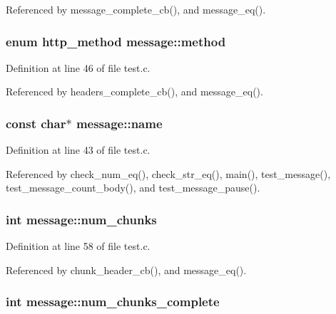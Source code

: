 Referenced by message\+\_\+complete\+\_\+cb(), and message\+\_\+eq().

\subsubsection[{method}]{\setlength{\rightskip}{0pt plus 5cm}enum {\bf http\+\_\+method} message\+::method}\label{structmessage_a9707fdb13e3f05606b4fad35b404c5e8}


Definition at line 46 of file test.\+c.



Referenced by headers\+\_\+complete\+\_\+cb(), and message\+\_\+eq().

\subsubsection[{name}]{\setlength{\rightskip}{0pt plus 5cm}const char$\ast$ message\+::name}\label{structmessage_a46a17bdb897a45bb7311769fd35821fb}


Definition at line 43 of file test.\+c.



Referenced by check\+\_\+num\+\_\+eq(), check\+\_\+str\+\_\+eq(), main(), test\+\_\+message(), test\+\_\+message\+\_\+count\+\_\+body(), and test\+\_\+message\+\_\+pause().

\subsubsection[{num\+\_\+chunks}]{\setlength{\rightskip}{0pt plus 5cm}int message\+::num\+\_\+chunks}\label{structmessage_a245821c4468193ef14eb651b7f3d3d38}


Definition at line 58 of file test.\+c.



Referenced by chunk\+\_\+header\+\_\+cb(), and message\+\_\+eq().

\subsubsection[{num\+\_\+chunks\+\_\+complete}]{\setlength{\rightskip}{0pt plus 5cm}int message\+::num\+\_\+chunks\+\_\+complete}\label{structmessage_a5cce7fc185d36bdf6f70b173a1ca1502}


